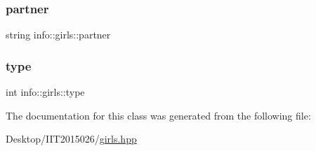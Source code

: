\mbox{\label{classinfo_1_1girls_a3eae9023ed6e3232e784048d91bcadf6}} 
\subsubsection{\texorpdfstring{partner}{partner}}
{\footnotesize\ttfamily string info\+::girls\+::partner\hspace{0.3cm}{\ttfamily [private]}}

\mbox{\label{classinfo_1_1girls_a849be918567f7694dbad760c469fa5b3}} 
\subsubsection{\texorpdfstring{type}{type}}
{\footnotesize\ttfamily int info\+::girls\+::type\hspace{0.3cm}{\ttfamily [private]}}



The documentation for this class was generated from the following file\+:\begin{DoxyCompactItemize}
\item 
Desktop/\+I\+I\+T2015026/\hyperlink{girls_8hpp}{girls.\+hpp}\end{DoxyCompactItemize}
